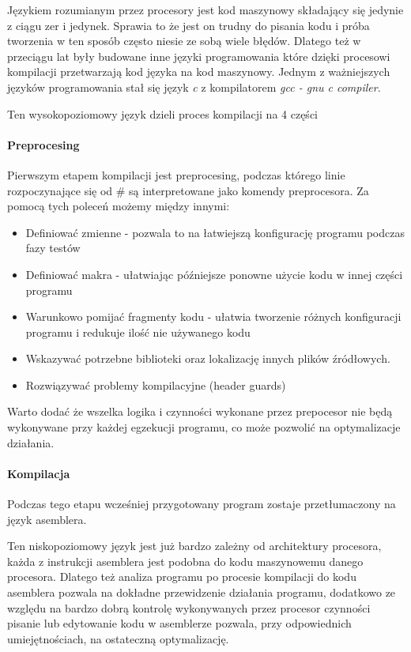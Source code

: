 Językiem rozumianym przez procesory jest kod maszynowy składający się jedynie z ciągu zer i jedynek.
Sprawia to że jest on trudny do pisania kodu i próba tworzenia w ten sposób często niesie ze sobą wiele błędów. 
Dlatego też w przeciągu lat były budowane inne języki programowania które dzięki procesowi kompilacji przetwarzają kod języka na kod maszynowy. 
Jednym z ważniejszych języków programowania stał się język \textit{c} z kompilatorem \textit{gcc - gnu c compiler}\cite{gcc}. 

Ten wysokopoziomowy język dzieli proces kompilacji na 4 części

\paragraph{Preprocesing}

Pierwszym etapem kompilacji jest preprocesing, podczas którego linie rozpoczynające się od \# są interpretowane jako komendy preprocesora.  
Za pomocą tych poleceń możemy między innymi:
\begin{itemize}
        \item Definiować zmienne - pozwala to na łatwiejszą konfigurację programu podczas fazy testów
        \item Definiować makra - ułatwiając późniejsze ponowne użycie kodu w innej części programu
        \item Warunkowo pomijać fragmenty kodu - ułatwia tworzenie różnych konfiguracji programu i redukuje ilość nie używanego kodu
        \item Wskazywać potrzebne biblioteki oraz lokalizację innych plików źródłowych.
        \item Rozwiązywać problemy kompilacyjne (header guards)
\end{itemize}
Warto dodać że wszelka logika i czynności wykonane przez prepocesor nie będą wykonywane przy każdej egzekucji programu, co może pozwolić na optymalizacje działania. 

\paragraph{Kompilacja}

Podczas tego etapu wcześniej przygotowany program zostaje przetłumaczony na język asemblera. 

Ten niskopoziomowy język jest już bardzo zależny od architektury procesora, każda z  instrukcji asemblera jest podobna do kodu maszynowemu danego procesora. 
Dlatego też analiza programu po procesie kompilacji do kodu asemblera pozwala na dokładne przewidzenie działania programu, dodatkowo
ze względu na bardzo dobrą kontrolę wykonywanych przez procesor czynności pisanie lub edytowanie kodu w asemblerze pozwala, przy odpowiednich umiejętnościach, na ostateczną optymalizację. 

